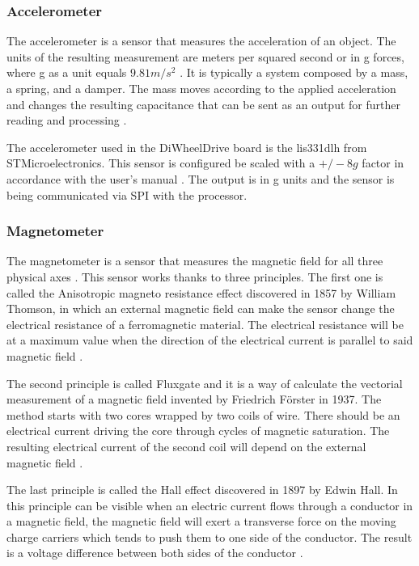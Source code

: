 \documentclass[12pt]{report}%
\begin{document}
\subsubsection{Accelerometer}
The accelerometer is a sensor that measures the acceleration of an object. The units of the resulting measurement are meters per squared second or in g forces, where g as a unit equals $9.81 m/s^2$ \cite{accelerometertheory}. It is typically a system composed by a mass, a spring, and a damper. The mass moves according to the applied acceleration and changes the resulting capacitance that can be sent as an output for further reading and processing \cite{AMiRo_ppt_v1}.

The accelerometer used in the DiWheelDrive board is the lis331dlh from STMicroelectronics. This sensor is configured be scaled with a $+/-8g$ factor in accordance with the user's manual \cite{accelerometerpart}. The output is in g units and the sensor is being communicated via SPI with the processor.

\subsubsection{Magnetometer}
The magnetometer is a sensor that measures the magnetic field for all three physical axes \cite{magnetometertheory}. This sensor works thanks to three principles. The first one is called the Anisotropic magneto resistance effect discovered in 1857 by William Thomson, in which an external magnetic field can make the sensor change the electrical resistance of a ferromagnetic material. The electrical resistance will be at a maximum value when the direction of the electrical current is parallel to said magnetic field \cite{AMiRo_ppt_v1}.

The second principle is called Fluxgate and it is a way of calculate the vectorial measurement of a magnetic field invented by Friedrich Förster in 1937. The method starts with two cores wrapped by two coils of wire. There should be an electrical current driving the core through cycles of magnetic saturation. The resulting electrical current of the second coil will depend on the external magnetic field \cite{AMiRo_ppt_v1}.

The last principle is called the Hall effect discovered in 1897 by Edwin Hall. In this principle can be visible when an electric current flows through a conductor in a magnetic field, the magnetic field will exert a transverse force on the moving charge carriers which tends to push them to one side of the conductor. The result is a voltage difference between both sides of the conductor \cite{halleffect}.
\end{document}
